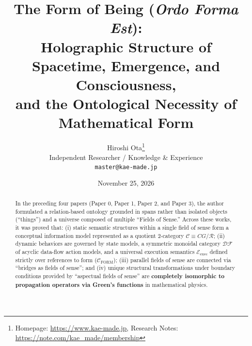 \documentclass[11pt,a4paper]{article}
\title{\textbf{The Form of Being (\textit{Ordo Forma Est}):}\\
\Large Holographic Structure of Spacetime, Emergence, and Consciousness,\\
and the Ontological Necessity of Mathematical Form}
\author{Hiroshi Ota\thanks{Homepage: \url{https://www.kae-made.jp}, Research Notes: \url{https://note.com/kae_made/membership}}\\
\small Independent Researcher / Knowledge \& Experience\\
\small \texttt{master@kae-made.jp}}
\date{November 25, 2026}
\theoremstyle{definition}
\theoremstyle{plain}
\begin{document}
\maketitle

\begin{abstract}
In the preceding four papers (Paper 0, Paper 1, Paper 2, and Paper 3), the author formulated a relation-based ontology grounded in spans rather than isolated objects (``things'') and a universe composed of multiple ``Fields of Sense.'' Across these works, it was proved that: (i) static semantic structures within a single field of sense form a conceptual information model represented as a quotient 2-category $\mathcal{C} \equiv CG/\mathcal{R}$; (ii) dynamic behaviors are governed by state models, a symmetric monoidal category $\mathcal{DF}$ of acyclic data-flow action models, and a universal execution semantics $\mathcal{E}_{\mathrm{exec}}$ defined strictly over references to form ($\mathcal{C}_{\mathrm{FORM}}$); (iii) parallel fields of sense are connected via ``bridges as fields of sense''; and (iv) unique structural transformations under boundary conditions provided by ``aspectual fields of sense'' are \textbf{completely isomorphic to propagation operators via Green's functions} in mathematical physics.


\end{abstract}
\end{document}
